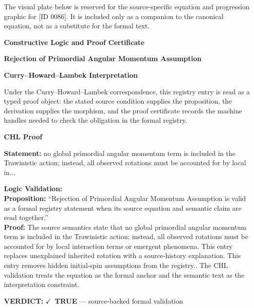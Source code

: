 \begingroup\footnotesize\sloppy
The visual plate below is reserved for the source-specific equation and progression graphic for [ID 0086]. It is included only as a companion to the canonical equation, not as a substitute for the formal text.
\par\endgroup
\ifTZPDarkEdition
{}
\fi

\clearpage
\begingroup\tzpsupportsetup
\noindent\textbf{\fontsize{10.8pt}{12.8pt}\selectfont [ID 0086] Constructive Logic and Proof Certificate}\par
\noindent\textbf{\fontsize{10pt}{12pt}\selectfont Rejection of Primordial Angular Momentum Assumption}\par
\vspace{0.45em}
\begingroup
\footnotesize
\setlength{\parskip}{0.22em}
\setlength{\parindent}{0pt}
\noindent\textbf{Curry--Howard--Lambek Interpretation}\par
Under the Curry--Howard--Lambek correspondence, this registry entry is read as a typed proof
object: the stated source condition supplies the proposition, the derivation supplies the
morphism, and the proof certificate records the machine handles needed to check the obligation
in the formal registry.

\vspace{0.45em}
\noindent\textbf{CHL Proof}\par
\textbf{Statement:} no global primordial angular momentum term is included in the Trawinistic action;
instead, all observed rotations must be accounted for by local in...

\textbf{Logic Validation:}\\
\textbf{Proposition:} ``Rejection of Primordial Angular Momentum Assumption is valid as a formal registry
statement when its source equation and semantic claim are read together.''\\
\textbf{Proof:} The source semantics state that no global primordial angular momentum term is included
in the Trawinistic action; instead, all observed rotations must be accounted for by
local interaction terms or emergent phenomena. This entry replaces unexplained inherited
rotation with a source-history explanation. This entry removes hidden initial-spin
assumptions from the registry.. The CHL validation treats the equation as the formal
anchor and the semantic text as the interpretation constraint.

\textbf{VERDICT:} \ensuremath{\checkmark}\ \textbf{TRUE} --- source-backed formal validation

